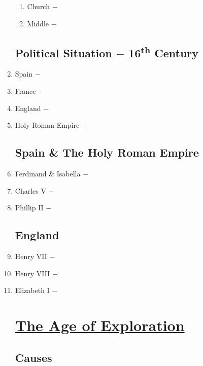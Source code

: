 \documentclass[12pt]{article}
\begin{document}
\begin{enumerate}
\begin{enumerate}[label=\arabic{*}.]
\item Church $-$

\item Middle $-$

\end{enumerate}

\subsection{Political Situation $-$ 16\textsuperscript{th} Century}

\setcounter{enumi}{39}

\item Spain $-$

\item France $-$

\item England $-$

\item Holy Roman Empire $-$

\subsection{Spain \& The Holy Roman Empire}

\item Ferdinand \& Isabella $-$

\item Charles V $-$

\item Phillip II $-$

\subsection{England}

\item Henry VII $-$

\item Henry VIII $-$

\item Elizabeth I $-$

\begin{center}
\section{\underline{The Age of Exploration}}
\end{center}

\subsection{Causes}


\end{enumerate}
\end{document}
